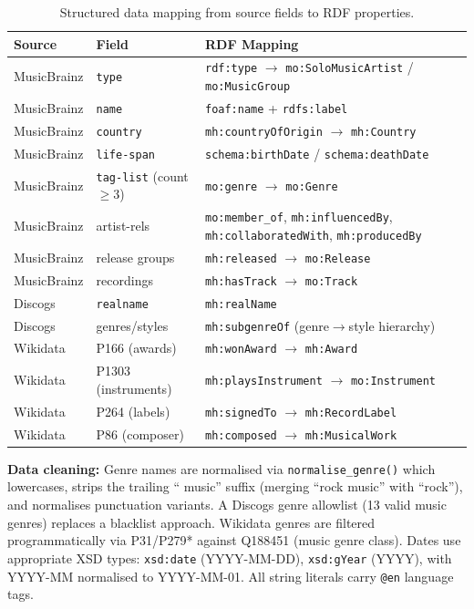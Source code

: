 \documentclass[11pt,a4paper]{article}
\begin{document}
\begin{table}[h]
\centering
\small
\begin{tabular}{llp{6cm}}
\toprule
\textbf{Source} & \textbf{Field} & \textbf{RDF Mapping} \\
\midrule
MusicBrainz & \texttt{type} & \texttt{rdf:type} $\rightarrow$ \texttt{mo:SoloMusicArtist} / \texttt{mo:MusicGroup} \\
MusicBrainz & \texttt{name} & \texttt{foaf:name} + \texttt{rdfs:label} \\
MusicBrainz & \texttt{country} & \texttt{mh:countryOfOrigin} $\rightarrow$ \texttt{mh:Country} \\
MusicBrainz & \texttt{life-span} & \texttt{schema:birthDate} / \texttt{schema:deathDate} \\
MusicBrainz & \texttt{tag-list} (count$\geq$3) & \texttt{mo:genre} $\rightarrow$ \texttt{mo:Genre} \\
MusicBrainz & artist-rels & \texttt{mo:member\_of}, \texttt{mh:influencedBy}, \texttt{mh:collaboratedWith}, \texttt{mh:producedBy} \\
MusicBrainz & release groups & \texttt{mh:released} $\rightarrow$ \texttt{mo:Release} \\
MusicBrainz & recordings & \texttt{mh:hasTrack} $\rightarrow$ \texttt{mo:Track} \\
Discogs & \texttt{realname} & \texttt{mh:realName} \\
Discogs & genres/styles & \texttt{mh:subgenreOf} (genre$\rightarrow$style hierarchy) \\
Wikidata & P166 (awards) & \texttt{mh:wonAward} $\rightarrow$ \texttt{mh:Award} \\
Wikidata & P1303 (instruments) & \texttt{mh:playsInstrument} $\rightarrow$ \texttt{mo:Instrument} \\
Wikidata & P264 (labels) & \texttt{mh:signedTo} $\rightarrow$ \texttt{mh:RecordLabel} \\
Wikidata & P86 (composer) & \texttt{mh:composed} $\rightarrow$ \texttt{mh:MusicalWork} \\
\bottomrule
\end{tabular}
\caption{Structured data mapping from source fields to RDF properties.}
\label{tab:mapping}
\end{table}

\textbf{Data cleaning:} Genre names are normalised via \texttt{normalise\_genre()} which lowercases, strips the trailing `` music'' suffix (merging ``rock music'' with ``rock''), and normalises punctuation variants. A Discogs genre allowlist (13 valid music genres) replaces a blacklist approach. Wikidata genres are filtered programmatically via P31/P279* against Q188451 (music genre class). Dates use appropriate XSD types: \texttt{xsd:date} (YYYY-MM-DD), \texttt{xsd:gYear} (YYYY), with YYYY-MM normalised to YYYY-MM-01. All string literals carry \texttt{@en} language tags.
\end{document}
